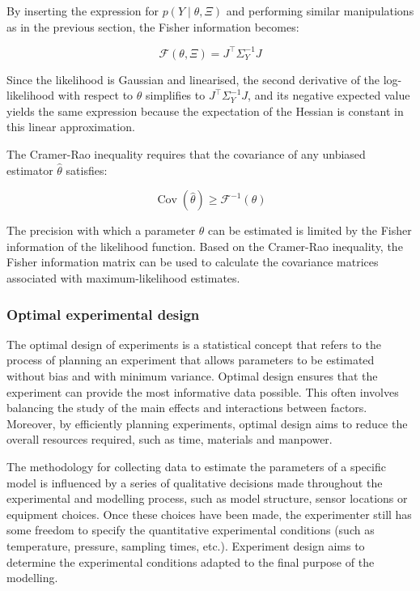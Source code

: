\documentclass[a4paper,fleqn]{cas-dc}
\begin{document}
		By inserting the expression for $p\left( Y \mid \theta, \Xi \right)$ and performing similar manipulations as in the previous section, the Fisher information becomes:
		
		{\footnotesize \begin{equation} \mathcal{F}(\theta, \Xi) = J^\top \Sigma_Y^{-1} J \end{equation} }
		
		Since the likelihood is Gaussian and linearised, the second derivative of the log-likelihood with respect to $\theta$ simplifies to $J^\top \Sigma_Y^{-1} J$, and its negative expected value yields the same expression because the expectation of the Hessian is constant in this linear approximation.
		
		The Cramer-Rao inequality requires that the covariance of any unbiased estimator $\hat{\theta}$ satisfies:
		
		{\footnotesize \begin{equation} \operatorname{Cov}(\hat{\theta}) \geq \mathcal{F}^{-1}(\theta) \end{equation} }
		
		The precision with which a parameter $\theta$ can be estimated is limited by the Fisher information of the likelihood function. Based on the Cramer-Rao inequality, the Fisher information matrix can be used to calculate the covariance matrices associated with maximum-likelihood estimates.
		
		\subsubsection{Optimal experimental design}
		
		The optimal design of experiments is a statistical concept that refers to the process of planning an experiment that allows parameters to be estimated without bias and with minimum variance. Optimal design ensures that the experiment can provide the most informative data possible. This often involves balancing the study of the main effects and interactions between factors. Moreover, by efficiently planning experiments, optimal design aims to reduce the overall resources required, such as time, materials and manpower.
		
		The methodology for collecting data to estimate the parameters of a specific model is influenced by a series of qualitative decisions made throughout the experimental and modelling process, such as model structure, sensor locations or equipment choices. Once these choices have been made, the experimenter still has some freedom to specify the quantitative experimental conditions (such as temperature, pressure, sampling times, etc.). Experiment design aims to determine the experimental conditions adapted to the final purpose of the modelling.
		
\end{document}
